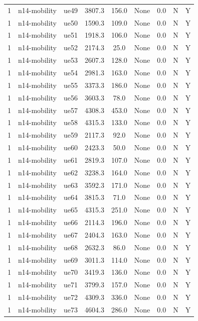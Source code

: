 \begin{table}[ht]
\begin{tabular}{|c|c|c|c|c|c|c|c|c|}
1 & n14-mobility & ue49 & 3807.3 & 156.0 & None & 0.0 & N & Y \\
1 & n14-mobility & ue50 & 1590.3 & 109.0 & None & 0.0 & N & Y \\
1 & n14-mobility & ue51 & 1918.3 & 106.0 & None & 0.0 & N & Y \\
1 & n14-mobility & ue52 & 2174.3 & 25.0 & None & 0.0 & N & Y \\
1 & n14-mobility & ue53 & 2607.3 & 128.0 & None & 0.0 & N & Y \\
1 & n14-mobility & ue54 & 2981.3 & 163.0 & None & 0.0 & N & Y \\
1 & n14-mobility & ue55 & 3373.3 & 186.0 & None & 0.0 & N & Y \\
1 & n14-mobility & ue56 & 3603.3 & 78.0 & None & 0.0 & N & Y \\
1 & n14-mobility & ue57 & 4308.3 & 453.0 & None & 0.0 & N & Y \\
1 & n14-mobility & ue58 & 4315.3 & 133.0 & None & 0.0 & N & Y \\
1 & n14-mobility & ue59 & 2117.3 & 92.0 & None & 0.0 & N & Y \\
1 & n14-mobility & ue60 & 2423.3 & 50.0 & None & 0.0 & N & Y \\
1 & n14-mobility & ue61 & 2819.3 & 107.0 & None & 0.0 & N & Y \\
1 & n14-mobility & ue62 & 3238.3 & 164.0 & None & 0.0 & N & Y \\
1 & n14-mobility & ue63 & 3592.3 & 171.0 & None & 0.0 & N & Y \\
1 & n14-mobility & ue64 & 3815.3 & 71.0 & None & 0.0 & N & Y \\
1 & n14-mobility & ue65 & 4315.3 & 251.0 & None & 0.0 & N & Y \\
1 & n14-mobility & ue66 & 2114.3 & 196.0 & None & 0.0 & N & Y \\
1 & n14-mobility & ue67 & 2404.3 & 163.0 & None & 0.0 & N & Y \\
1 & n14-mobility & ue68 & 2632.3 & 86.0 & None & 0.0 & N & Y \\
1 & n14-mobility & ue69 & 3011.3 & 114.0 & None & 0.0 & N & Y \\
1 & n14-mobility & ue70 & 3419.3 & 136.0 & None & 0.0 & N & Y \\
1 & n14-mobility & ue71 & 3799.3 & 157.0 & None & 0.0 & N & Y \\
1 & n14-mobility & ue72 & 4309.3 & 336.0 & None & 0.0 & N & Y \\
1 & n14-mobility & ue73 & 4604.3 & 286.0 & None & 0.0 & N & Y \\

\end{tabular}
\end{table}
